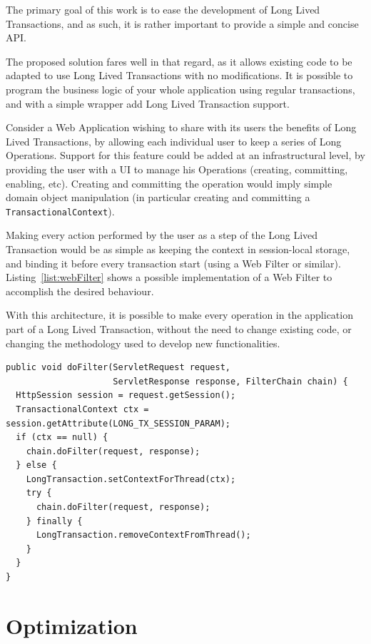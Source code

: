 \documentclass{llncs}
\begin{document}
The primary goal of this work is to ease the development of Long Lived
Transactions, and as such, it is rather important to provide a simple
and concise API.

The proposed solution fares well in that regard, as it allows existing
code to be adapted to use Long Lived Transactions with no
modifications. It is possible to program the business logic of your
whole application using regular transactions, and with a simple
wrapper add Long Lived Transaction support.

Consider a Web Application wishing to share with its users the
benefits of Long Lived Transactions, by allowing each individual user
to keep a series of Long Operations. Support for this feature could be
added at an infrastructural level, by providing the user with a UI to
manage his Operations (creating, committing, enabling, etc). Creating
and committing the operation would imply simple domain object
manipulation (in particular creating and committing a
\texttt{TransactionalContext}).

Making every action performed by the user as a step of the Long Lived
Transaction would be as simple as keeping the context in session-local
storage, and binding it before every transaction start (using a Web
Filter or similar). Listing~\ref{list:webFilter} shows a possible
implementation of a Web Filter to accomplish the desired behaviour.

With this architecture, it is possible to make every operation in the
application part of a Long Lived Transaction, without the need to
change existing code, or changing the methodology used to develop new
functionalities.

\begin{lstlisting}[caption={Web Filter to wrap every transaction in a
    TransactionalContext},label={list:webFilter},float]
public void doFilter(ServletRequest request, 
                     ServletResponse response, FilterChain chain) {
  HttpSession session = request.getSession();
  TransactionalContext ctx = session.getAttribute(LONG_TX_SESSION_PARAM);
  if (ctx == null) {
    chain.doFilter(request, response);
  } else {
    LongTransaction.setContextForThread(ctx);
    try {
      chain.doFilter(request, response);
    } finally {
      LongTransaction.removeContextFromThread();
    }
  }
}
\end{lstlisting}


\section{Optimization}
\end{document}
